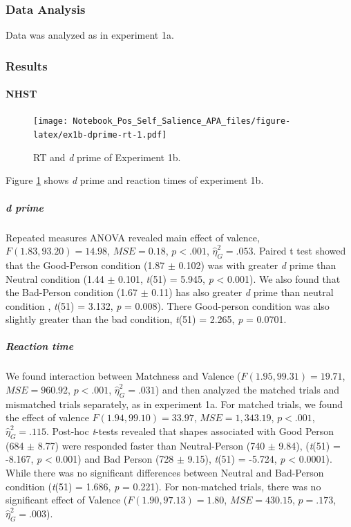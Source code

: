\documentclass[
  english,
  man]{apa6}
\let\oldparagraph\paragraph
\renewcommand{\paragraph}[1]{\oldparagraph{#1}\mbox{}}
\let\oldsubparagraph\subparagraph
\renewcommand{\subparagraph}[1]{\oldsubparagraph{#1}\mbox{}}
\begin{document}
\hypertarget{data-analysis-2}{%
\subsubsection{Data Analysis}\label{data-analysis-2}}

Data was analyzed as in experiment 1a.

\hypertarget{results-1}{%
\subsubsection{Results}\label{results-1}}

\hypertarget{nhst}{%
\paragraph{NHST}\label{nhst}}

\begin{figure}
\centering
\texttt{[image: Notebook\_Pos\_Self\_Salience\_APA\_files/figure-latex/ex1b-dprime-rt-1.pdf]}
\caption{\label{fig:ex1b-dprime-rt}RT and \emph{d} prime of Experiment 1b.}
\end{figure}

Figure \ref{fig:ex1b-dprime-rt} shows \emph{d} prime and reaction times of experiment 1b.

\hypertarget{d-prime-2}{%
\subparagraph{d prime}\label{d-prime-2}}

Repeated measures ANOVA revealed main effect of valence, \(F(1.83, 93.20) = 14.98\), \(\mathit{MSE} = 0.18\), \(p < .001\), \(\hat{\eta}^2_G = .053\). Paired t test showed that the Good-Person condition (1.87 \(\pm\) 0.102) was with greater \emph{d} prime than Neutral condition (1.44 \(\pm\) 0.101, \emph{t}(51) = 5.945, \emph{p} \textless{} 0.001). We also found that the Bad-Person condition (1.67 \(\pm\) 0.11) has also greater \emph{d} prime than neutral condition , \emph{t}(51) = 3.132, \emph{p} = 0.008). There Good-person condition was also slightly greater than the bad condition, \emph{t}(51) = 2.265, \emph{p} = 0.0701.

\hypertarget{reaction-time}{%
\subparagraph{Reaction time}\label{reaction-time}}

We found interaction between Matchness and Valence (\(F(1.95, 99.31) = 19.71\), \(\mathit{MSE} = 960.92\), \(p < .001\), \(\hat{\eta}^2_G = .031\)) and then analyzed the matched trials and mismatched trials separately, as in experiment 1a. For matched trials, we found the effect of valence \(F(1.94, 99.10) = 33.97\), \(\mathit{MSE} = 1,343.19\), \(p < .001\), \(\hat{\eta}^2_G = .115\). Post-hoc \emph{t}-tests revealed that shapes associated with Good Person (684 \(\pm\) 8.77) were responded faster than Neutral-Person (740 \(\pm\) 9.84), (\emph{t}(51) = -8.167, \emph{p} \textless{} 0.001) and Bad Person (728 \(\pm\) 9.15), \emph{t}(51) = -5.724, \emph{p} \textless{} 0.0001). While there was no significant differences between Neutral and Bad-Person condition (\emph{t}(51) = 1.686, \emph{p} = 0.221). For non-matched trials, there was no significant effect of Valence (\(F(1.90, 97.13) = 1.80\), \(\mathit{MSE} = 430.15\), \(p = .173\), \(\hat{\eta}^2_G = .003\)).
\end{document}
